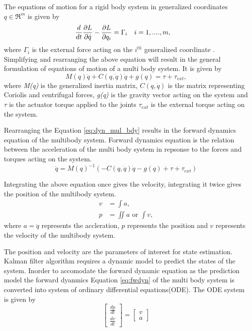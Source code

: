 The equations of motion for a rigid body system in generalized coordinates $q \in \Re^m $ is given by
\begin{align}
\label{eq:lagrange}
\frac{d}{dt} &\frac{\partial {L}}{\partial {\dot{q}}} - \frac{\partial {L}}{\partial {q_i}} = \Gamma_i && i=1,....,m,
\end{align}
where $\Gamma_i$ is the external force acting on the $i^{th}$ generalized coordinate \cite[Chapter 4]{mur94}.
Simplifying and rearranging the above equation will result in the general formulation of equations of motion of a multi body system. It is given by
\begin{equation}
\label{eq:dyn_mul_bdy}
M(q)\ddot{q}+C(q,\dot{q})\dot{q}+g(q) = \tau + \tau_{ext},
\end{equation}
where \emph{M(q)} is the generalized inertia matrix, $C(q,\dot{q})$ is the matrix representing Coriolis and centrifugal forces, \emph{g(q)} is the gravity vector acting on the system and $\tau$ is the actuator torque applied to the joints $\tau_{ext}$ is the external torque acting on the system.

Rearranging the Equation \ref{eq:dyn_mul_bdy} results in the forward dynamics equation of the multibody system. Forward dynamics equation is the relation between the acceleration of the multi body system in repsonse to the forces and torques acting on the system.
\begin{equation}
    \label{eq:fwdyn}
    \ddot{q} = M(q)^{-1} (- C(q,\dot{q})\dot{q} -g(q) + \tau + \tau_{ext})
\end{equation}

Integrating the above equation once gives the velocity, integrating it twice gives the position of the multibody system. 
$$ \begin{aligned} 
    v &= \int a ,\\ 
    p &=  \iint a \text{ or } \int v , 
    \end{aligned}$$ where $a = \ddot{q}$ represents the accleration, $p$ represents the position and $v$ represents the velocity of the multibody system.

The position and velocity are the parameters of interest for state estimation. Kalman filter algorithm requires a dynamic model to predict the states of the system. Inorder to accomodate the forward dynamic equation as the prediction model the forward dyanmics Equation \ref{eq:fwdyn} of the multi body system is converted into system of ordinary differential equations(ODE). The ODE system is given by
\begin{equation}
    \begin{bmatrix} \frac{dp}{dt}  \\ \frac{dv}{dt} \end{bmatrix} = 
    \begin{bmatrix} v \\ a \end{bmatrix}
\end{equation}
 
